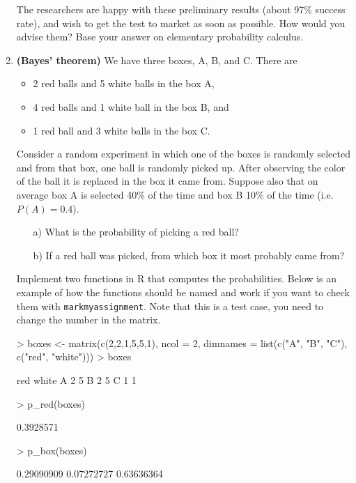\documentclass[11pt,a4paper,english]{article}
\begin{document}
\begin{enumerate}
  The researchers are happy with these preliminary results (about 97$\%$
  success rate), and wish to get the test to market as soon as possible. How would you advise them? Base your answer on elementary probability calculus.


\item {\bf (Bayes' theorem)} We have three boxes, A, B, and C. There are
  \begin{itemize}
    \item 2 red balls and 5 white balls in the box A,
    \item 4 red balls and 1 white ball in the box B, and
    \item 1 red ball and 3 white balls in the box C.
  \end{itemize}
Consider a random experiment in which one of the boxes is randomly
selected and from that box, one ball is randomly picked up. After
observing the color of the ball it is replaced in the box it came
from. Suppose also that on average box A is selected 40\% of the time
and box B 10\% of the time (i.e. $P(A) = 0.4$).

\begin{itemize}
\item[a)] What is the probability of picking a red ball? 
\item[b)] If a red ball was picked, from which box it most probably came from? 
\end{itemize}

Implement two functions in R that computes the probabilities. Below is an example of how the functions should be named and work if you want to check them with \texttt{markmyassignment}. 
Note that this is a test case, you need to change the number in the matrix.

\begin{Schunk}
\begin{Sinput}
> boxes <- matrix(c(2,2,1,5,5,1), ncol = 2, 
     dimnames = list(c("A", "B", "C"), c("red", "white")))
> boxes
\end{Sinput}
\begin{Soutput}
  red white
A   2     5
B   2     5
C   1     1
\end{Soutput}
\end{Schunk}


\begin{Schunk}
\begin{Sinput}
> p_red(boxes)
\end{Sinput}
\begin{Soutput}
[1] 0.3928571
\end{Soutput}
\begin{Sinput}
> p_box(boxes)
\end{Sinput}
\begin{Soutput}
[1] 0.29090909 0.07272727 0.63636364
\end{Soutput}
\end{Schunk}



\end{enumerate}
\end{document}
